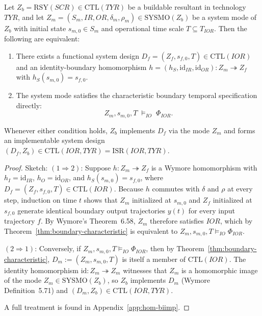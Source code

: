 \begin{theorem}
\label{thm:mode-ior-bridge}
Let $Z_b=\mathrm{RSY}(SCR)\in\mathrm{CTL}(TYR)$ be a buildable resultant in technology $TYR$, and let $Z_m=(S_m,IR,OR,\delta_m,\rho_m)\in\mathrm{SYSMO}(Z_b)$ be a system mode of $Z_b$ with initial state $s_{m,0}\in S_m$ and operational time scale $T\subseteq T_{IOR}$. Then the following are equivalent:
\begin{enumerate}
    \item There exists a functional system design $D_f=(Z_f,s_{f,0},T)\in\mathrm{CTL}(IOR)$ and an identity-boundary homomorphism $h=(h_S,\mathrm{id}_{IR},\mathrm{id}_{OR}):Z_m\twoheadrightarrow Z_f$ with $h_S(s_{m,0})=s_{f,0}$.
    \item The system mode satisfies the characteristic boundary temporal specification directly:
    \[
        Z_m,s_{m,0},T\;\models_{IO}\;\Phi_{IOR}.
    \]
\end{enumerate}
Whenever either condition holds, $Z_b$ implements $D_f$ via the mode $Z_m$ and forms an implementable system design $(D_f,Z_b)\in\mathrm{CTL}(IOR,TYR)=\mathrm{ISR}(IOR,TYR)$.
\end{theorem}

\begin{proof}
Sketch: $(1\Rightarrow 2)$: Suppose $h:Z_m\twoheadrightarrow Z_f$ is a Wymore homomorphism with $h_I=\mathrm{id}_{IR}$, $h_O=\mathrm{id}_{OR}$, and $h_S(s_{m,0})=s_{f,0}$, where $D_f=(Z_f,s_{f,0},T)\in\mathrm{CTL}(IOR)$. Because $h$ commutes with $\delta$ and $\rho$ at every step, induction on time $t$ shows that $Z_m$ initialized at $s_{m,0}$ and $Z_f$ initialized at $s_{f,0}$ generate identical boundary output trajectories $y(t)$ for every input trajectory $f$. By Wymore's Theorem~6.58, $Z_m$ therefore satisfies $IOR$, which by Theorem~\ref{thm:boundary-characteristic} is equivalent to $Z_m,s_{m,0},T\models_{IO}\Phi_{IOR}$.

$(2\Rightarrow 1)$: Conversely, if $Z_m,s_{m,0},T\models_{IO}\Phi_{IOR}$, then by Theorem~\ref{thm:boundary-characteristic}, $D_m:=(Z_m,s_{m,0},T)$ is itself a member of $\mathrm{CTL}(IOR)$. The identity homomorphism $\mathrm{id}:Z_m\twoheadrightarrow Z_m$ witnesses that $Z_m$ is a homomorphic image of the mode $Z_m\in\mathrm{SYSMO}(Z_b)$, so $Z_b$ implements $D_m$ (Wymore Definition~5.71) and $(D_m,Z_b)\in\mathrm{CTL}(IOR,TYR)$.

A full treatment is found in Appendix~\ref{app:hom-biimp}.
\end{proof}

